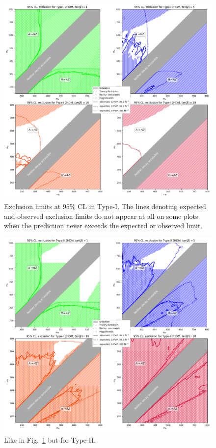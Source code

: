 \begin{figure}[t!]
	\centering
    \includegraphics[width=\textwidth]{single_tbs/type1.png}
    \caption{Exclusion limits at \(95\%\) CL in Type-I.
             The lines denoting expected and observed exclusion limits
             do not appear at all on some plots when the prediction never exceeds the 
             expected or observed  limit.}\label{fig1}
\end{figure}

\begin{figure}[t!]		
    \includegraphics[width=\textwidth]{single_tbs/type2.png}
    \caption{Like in Fig.~\ref{fig1} but for Type-II.}\label{fig2}
\end{figure}


